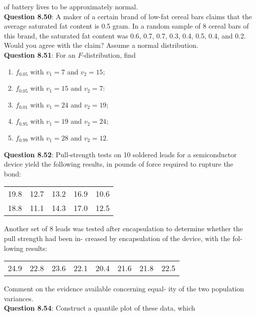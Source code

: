 \documentclass{article}
\begin{document}
    of battery lives to be approximately normal.\\\newline
    \textbf{Question 8.50}: A maker of a certain brand of low-fat cereal bars
    claims that the average saturated fat content is 0.5
    gram. In a random sample of 8 cereal bars of this
    brand, the saturated fat content was 0.6, 0.7, 0.7, 0.3,
    0.4, 0.5, 0.4, and 0.2. Would you agree with the claim?
    Assume a normal distribution.\\\newline
    \textbf{Question 8.51}: For an $F$-distribution, find
        \begin{enumerate}[label = (\alph*) ]
            \item $f_{0.05}$ with $v_1 = 7$ and $v_2 = 15$;
            \item $f_{0.05}$ with $v_1 = 15$ and $v_2 = 7$:
            \item $f_{0.01}$ with $v_1 = 24$ and $v_2 = 19$;
            \item $f_{0.95}$ with $v_1 = 19$ and $v_2 = 24$;
            \item $f_{0.99}$ with $v_1 = 28$ and $v_2 = 12$.
        \end{enumerate}
    \textbf{Question 8.52}: Pull-strength tests on 10 soldered leads for a
    semiconductor device yield the following results, in
    pounds of force required to rupture the bond:
        \begin{center}
            \begin{tabular}{c c c c c}
                19.8 & 12.7 & 13.2 & 16.9 & 10.6 \\
                18.8 & 11.1 & 14.3 & 17.0 & 12.5
            \end{tabular}
        \end{center}
    Another set of 8 leads was tested after encapsulation
    to determine whether the pull strength had been in-
    creased by encapsulation of the device, with the fol-
    lowing results:
        \begin{center}
            \begin{tabular}{c c c c c c c c}
                24.9 & 22.8 & 23.6 & 22.1 & 20.4 & 21.6 & 21.8 & 22.5
            \end{tabular}
        \end{center}
    Comment on the evidence available concerning equal-
    ity of the two population variances.\\\newline
    \textbf{Question 8.54}: Construct a quantile plot of these data, which
\end{document}
